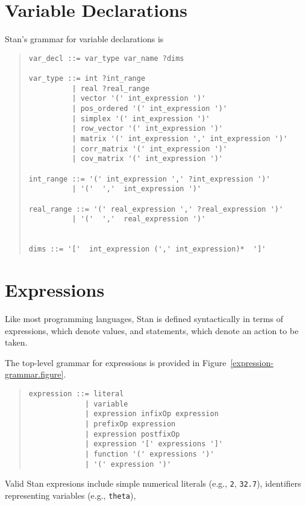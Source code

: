 \documentclass[10pt]{report}
\newcommand{\Stan}{Stan\xspace}
\newcommand{\code}[1]{{\tt #1}}
\newcommand{\reffigure}[1]{Figure~\ref{#1.figure}}
\begin{document}
\chapter{Variable Declarations}

\Stan's grammar for variable declarations is
%
\begin{quote}
\begin{Verbatim}
var_decl ::= var_type var_name ?dims

var_type ::= int ?int_range
          | real ?real_range
          | vector '(' int_expression ')'
          | pos_ordered '(' int_expression ')'
          | simplex '(' int_expression ')'
          | row_vector '(' int_expression ')'
          | matrix '(' int_expression ',' int_expression ')'
          | corr_matrix '(' int_expression ')'
          | cov_matrix '(' int_expression ')'

int_range ::= '(' int_expression ',' ?int_expression ')'
          | '('  ','  int_expression ')'

real_range ::= '(' real_expression ',' ?real_expression ')'
          | '('  ','  real_expression ')'


dims ::= '['  int_expression (',' int_expression)*  ']'
\end{Verbatim}
\end{quote}


\chapter{Expressions}

Like most programming languages, \Stan is defined syntactically in
terms of expressions, which denote values, and statements, which
denote an action to be taken.

The top-level grammar for expressions is provided in
\reffigure{expression-grammar}.

\begin{quote}
\begin{Verbatim}
expression ::= literal
             | variable
             | expression infixOp expression
             | prefixOp expression
             | expression postfixOp
             | expression '[' expressions ']'
             | function '(' expressions ')'
             | '(' expression ')'
\end{Verbatim}
\end{quote}


Valid \Stan expresions include simple numerical literals (e.g.,
\code{2}, \code{32.7}), identifiers representing variables (e.g.,
\code{theta}), 
\end{document}
